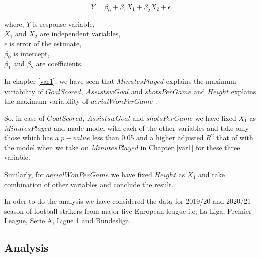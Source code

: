\documentclass[12pt]{article}
\begin{document}
\begin{minipage}{0.5\textwidth}
	$$ Y=\beta_0+\beta_1X_1+\beta_2X_2+\epsilon $$
\end{minipage} 
\hfill 
\begin{minipage}{0.5\textwidth}
	where, $ Y $ is response variable, \\ $ X_1 $ and $ X_2 $ are independent variables,\\
	$ \epsilon $ is error of the estimate, \\ $ \beta_0 $ is intercept, \\ $ \beta_1 $ and $ \beta_2 $ are coefficients.
\end{minipage} 

In chapter \ref{var1}, we have seen that $ MinutesPlayed $ explains the maximum variability of 
$ GoalScored $, $ AssistswGoal $ and $ shotsPerGame $ and $ Height $ explains the maximum variability of $ aerialWonPerGame $ . 

So, in case of $ GoalScored $, $ AssistswGoal $ and $ shotsPerGame $ we have fixed $ X_1 $ as $ MinutesPlayed $ and made model with each of the other variables and take only those which has a $ p-value $ less than 0.05 and a higher adjusted $ R^2 $ that of with the model when we take on $ MinutesPlayed $ in Chapter \ref{var1} for these  three variable. 

Similarly, for $ aerialWonPerGame $ we have fixed $ Height $ as $ X_1 $ and take combination of other variables and conclude the result.


In oder to do the analysis we have considered the data for 2019/20 and 2020/21 season of football strikers from major five European league i.e, La Liga, Premier League, Serie A, Ligue 1 and Bundesliga. 

\newpage
\subsection{Analysis}
\end{document}
